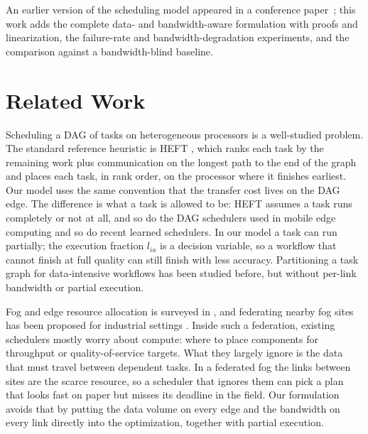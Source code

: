 \documentclass[conference]{IEEEtran}
\begin{document}
An earlier version of the scheduling model appeared in a conference paper~\cite{gupta2025efficient}; this work adds the complete data- and bandwidth-aware formulation with proofs and linearization, the failure-rate and bandwidth-degradation experiments, and the comparison against a bandwidth-blind baseline.


\section{Related Work}
\label{sec:related}

Scheduling a DAG of tasks on heterogeneous processors is a well-studied
problem. The standard reference heuristic is HEFT \cite{topcuoglu2002heft},
which ranks each task by the remaining work plus communication on the
longest path to the end of the graph and places each task, in rank order,
on the processor where it finishes earliest. Our model uses the same
convention that the transfer cost lives on the DAG edge. The difference
is what a task is allowed to be: HEFT assumes a task runs completely or
not at all, and so do the DAG schedulers used in mobile edge computing
\cite{li2023dagmec} and so do recent learned schedulers. In our model a task can run
partially; the execution fraction $l_{ia}$ is a decision variable, so a
workflow that cannot finish at full quality can still finish with less
accuracy. Partitioning a task graph for data-intensive workflows has
been studied before, but without per-link
bandwidth or partial execution.

Fog and edge resource allocation is surveyed in \cite{hong2019survey}, and federating nearby fog sites has been proposed for industrial settings \cite{fgcs2024}. Inside such a federation, existing schedulers mostly worry about compute: where to place components for throughput \cite{faticanti2020partitioning} or quality-of-service targets. What they largely ignore is the data that must travel between dependent tasks. In a federated fog the links between sites are the scarce resource, so a scheduler that ignores them can pick a plan that looks fast on paper but misses its deadline in the field. Our formulation avoids that by putting the data volume on every edge and the bandwidth on every link directly into the optimization, together with partial execution.
\end{document}

